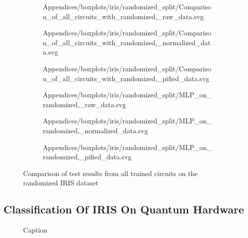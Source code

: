 \begin{figure}[!h]
    \begin{subfigure}{.5\textwidth}
        \centering
        
        {Appendices/boxplots/iris/randomized_split/Comparison_of_all_circuits_with_randomized,_raw_data.svg}
    \end{subfigure}
    \begin{subfigure}{.5\textwidth}
        \centering
        
        {Appendices/boxplots/iris/randomized_split/Comparison_of_all_circuits_with_randomized,_normalized_data.svg}
    \end{subfigure}
    \begin{subfigure}{.5\textwidth}
        \centering
        
        {Appendices/boxplots/iris/randomized_split/Comparison_of_all_circuits_with_randomized,_pified_data.svg}
    \end{subfigure}
    \begin{subfigure}{.5\textwidth}
        \centering
        
        {Appendices/boxplots/iris/randomized_split/MLP_on_randomized,_raw_data.svg}
    \end{subfigure}
    \begin{subfigure}{.5\textwidth}
        \centering
        
        {Appendices/boxplots/iris/randomized_split/MLP_on_randomized,_normalized_data.svg}
    \end{subfigure}
    \begin{subfigure}{.5\textwidth}
        \centering
        
        {Appendices/boxplots/iris/randomized_split/MLP_on_randomized,_pified_data.svg}
    \end{subfigure}
    \caption{Comparison of test results from all trained circuits on the randomized IRIS dataset}
    \label{fig:circuits_results_r_iris}
\end{figure}

\clearpage
\subsection{Classification Of IRIS On Quantum Hardware}

\begin{figure}[!h]
    \centering
    
    \caption{Caption}
    \label{fig:boxplot_real_hardware}
\end{figure}

